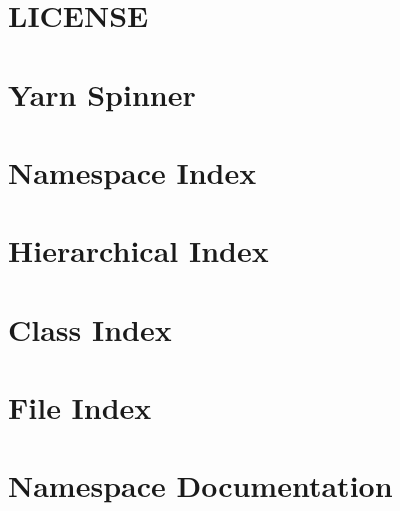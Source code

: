\documentclass[twoside]{book}
\begin{document}
\chapter{L\-I\-C\-E\-N\-S\-E}
\label{d7/d7a/a00016}
\hypertarget{d7/d7a/a00016}{}

\chapter{Yarn Spinner}
\label{d1/d2b/a00018}
\hypertarget{d1/d2b/a00018}{}

\chapter{Namespace Index}

\chapter{Hierarchical Index}

\chapter{Class Index}

\chapter{File Index}

\chapter{Namespace Documentation}









\end{document}
